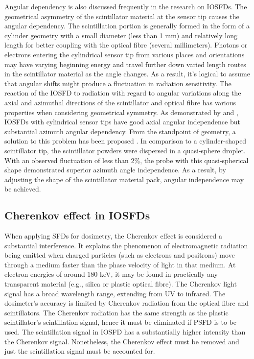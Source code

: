 \documentclass{article}
\begin{document}
\begin{multicols}{2}
Angular dependency is also discussed frequently in the research on IOSFDs. The geometrical asymmetry of the scintillator material at the sensor tip causes the angular dependency. The scintillation portion is generally formed in the form of a cylinder geometry with a small diameter (less than 1 mm) and relatively long length for better coupling with the optical fibre (several millimeters). Photons or electrons entering the cylindrical sensor tip from various places and orientations may have varying beginning energy and travel further down varied length routes in the scintillator material as the angle changes. As a result, it's logical to assume that angular shifts might produce a fluctuation in radiation sensitivity. The reaction of the IOSFD to radiation with regard to angular variations along the axial and azimuthal directions of the scintillator and optical fibre has various properties when considering geometrical symmetry. As demonstrated by \citeauthor{zhuang2016embedded} and \citeauthor{alharbi2018dosimetric}, IOSFDs with cylindrical sensor tips have good axial angular independence but substantial azimuth angular dependency. From the standpoint of geometry, a solution to this problem has been proposed \cite{martinez2017characterization}. In comparison to a cylinder-shaped scintillator tip, the scintillator powders were dispersed in a quasi-sphere droplet. With an observed fluctuation of less than 2\%, the probe with this quasi-spherical shape demonstrated superior azimuth angle independence. As a result, by adjusting the shape of the scintillator material pack, angular independence may be achieved.

\subsection{Cherenkov effect in IOSFDs}

When applying SFDs for dosimetry, the Cherenkov effect is considered a substantial interference. It explains the phenomenon of electromagnetic radiation being emitted when charged particles (such as electrons and positrons) move through a medium faster than the phase velocity of light in that medium. At electron energies of around 180 keV, it may be found in practically any transparent material (e.g., silica or plastic optical fibre). The Cherenkov light signal has a broad wavelength range, extending from UV to infrared\cite{ashraf2020dosimetry}. The dosimeter's accuracy is limited by Cherenkov radiation from the optical fibre and scintillators. The Cherenkov radiation has the same strength as the plastic scintillator's scintillation signal, hence it must be eliminated if PSFD is to be used. The scintillation signal in IOSFD has a substantially higher intensity than the Cherenkov signal. Nonetheless, the Cherenkov effect must be removed and just the scintillation signal must be accounted for. 


\end{multicols}
\end{document}

